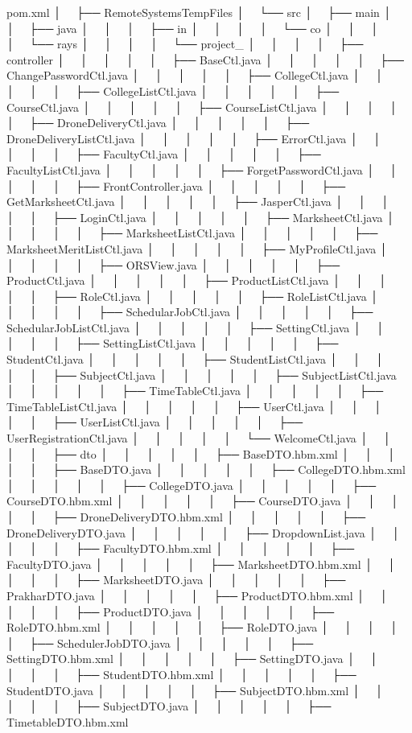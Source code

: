 pom.\+xml │   ├── Remote\+Systems\+Temp\+Files │   └── src │   ├── main │   │   ├── java │   │   │   ├── in │   │   │   │   └── co │   │   │   │   └── rays │   │   │   │   └── project\+\_ │   │   │   │   ├── controller │   │   │   │   │   ├── Base\+Ctl.\+java │   │   │   │   │   ├── Change\+Password\+Ctl.\+java │   │   │   │   │   ├── College\+Ctl.\+java │   │   │   │   │   ├── College\+List\+Ctl.\+java │   │   │   │   │   ├── Course\+Ctl.\+java │   │   │   │   │   ├── Course\+List\+Ctl.\+java │   │   │   │   │   ├── Drone\+Delivery\+Ctl.\+java │   │   │   │   │   ├── Drone\+Delivery\+List\+Ctl.\+java │   │   │   │   │   ├── Error\+Ctl.\+java │   │   │   │   │   ├── Faculty\+Ctl.\+java │   │   │   │   │   ├── Faculty\+List\+Ctl.\+java │   │   │   │   │   ├── Forget\+Password\+Ctl.\+java │   │   │   │   │   ├── Front\+Controller.\+java │   │   │   │   │   ├── Get\+Marksheet\+Ctl.\+java │   │   │   │   │   ├── Jasper\+Ctl.\+java │   │   │   │   │   ├── Login\+Ctl.\+java │   │   │   │   │   ├── Marksheet\+Ctl.\+java │   │   │   │   │   ├── Marksheet\+List\+Ctl.\+java │   │   │   │   │   ├── Marksheet\+Merit\+List\+Ctl.\+java │   │   │   │   │   ├── My\+Profile\+Ctl.\+java │   │   │   │   │   ├── ORSView.\+java │   │   │   │   │   ├── Product\+Ctl.\+java │   │   │   │   │   ├── Product\+List\+Ctl.\+java │   │   │   │   │   ├── Role\+Ctl.\+java │   │   │   │   │   ├── Role\+List\+Ctl.\+java │   │   │   │   │   ├── Schedular\+Job\+Ctl.\+java │   │   │   │   │   ├── Schedular\+Job\+List\+Ctl.\+java │   │   │   │   │   ├── Setting\+Ctl.\+java │   │   │   │   │   ├── Setting\+List\+Ctl.\+java │   │   │   │   │   ├── Student\+Ctl.\+java │   │   │   │   │   ├── Student\+List\+Ctl.\+java │   │   │   │   │   ├── Subject\+Ctl.\+java │   │   │   │   │   ├── Subject\+List\+Ctl.\+java │   │   │   │   │   ├── Time\+Table\+Ctl.\+java │   │   │   │   │   ├── Time\+Table\+List\+Ctl.\+java │   │   │   │   │   ├── User\+Ctl.\+java │   │   │   │   │   ├── User\+List\+Ctl.\+java │   │   │   │   │   ├── User\+Registration\+Ctl.\+java │   │   │   │   │   └── Welcome\+Ctl.\+java │   │   │   │   ├── dto │   │   │   │   │   ├── Base\+DTO.\+hbm.\+xml │   │   │   │   │   ├── Base\+DTO.\+java │   │   │   │   │   ├── College\+DTO.\+hbm.\+xml │   │   │   │   │   ├── College\+DTO.\+java │   │   │   │   │   ├── Course\+DTO.\+hbm.\+xml │   │   │   │   │   ├── Course\+DTO.\+java │   │   │   │   │   ├── Drone\+Delivery\+DTO.\+hbm.\+xml │   │   │   │   │   ├── Drone\+Delivery\+DTO.\+java │   │   │   │   │   ├── Dropdown\+List.\+java │   │   │   │   │   ├── Faculty\+DTO.\+hbm.\+xml │   │   │   │   │   ├── Faculty\+DTO.\+java │   │   │   │   │   ├── Marksheet\+DTO.\+hbm.\+xml │   │   │   │   │   ├── Marksheet\+DTO.\+java │   │   │   │   │   ├── Prakhar\+DTO.\+java │   │   │   │   │   ├── Product\+DTO.\+hbm.\+xml │   │   │   │   │   ├── Product\+DTO.\+java │   │   │   │   │   ├── Role\+DTO.\+hbm.\+xml │   │   │   │   │   ├── Role\+DTO.\+java │   │   │   │   │   ├── Scheduler\+Job\+DTO.\+java │   │   │   │   │   ├── Setting\+DTO.\+hbm.\+xml │   │   │   │   │   ├── Setting\+DTO.\+java │   │   │   │   │   ├── Student\+DTO.\+hbm.\+xml │   │   │   │   │   ├── Student\+DTO.\+java │   │   │   │   │   ├── Subject\+DTO.\+hbm.\+xml │   │   │   │   │   ├── Subject\+DTO.\+java │   │   │   │   │   ├── Timetable\+DTO.\+hbm.\+xml 